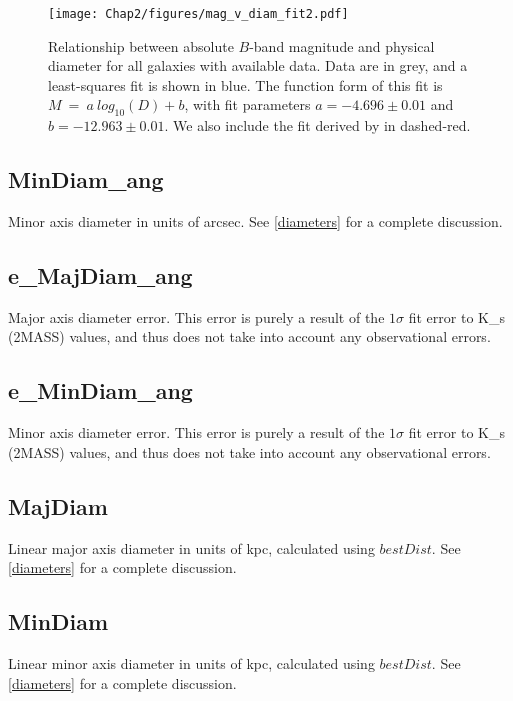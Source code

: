 \begin{figure}[ht!]
        \centering
        \vspace{0pt}
        \texttt{[image: Chap2/figures/mag\_v\_diam\_fit2.pdf]}
        \caption{\small{Relationship between absolute $B$-band magnitude and physical diameter for all galaxies with available data. Data are in grey, and a least-squares fit is shown in blue. The function form of this fit is $M ~=~ a ~ log_{10}(D) + b$, with fit parameters $a = -4.696 \pm 0.01$ and $b = -12.963 \pm 0.01$. We also include the fit derived by \cite{wakker2009} in dashed-red.}}
        \label{magvdiam}
\end{figure}


\subsection{MinDiam\_ang} \label{MinDiam_ang}
Minor axis diameter in units of arcsec. See \ref{diameters} for a complete discussion.

\subsection{e\_MajDiam\_ang} \label{e_MinDiam_ang}
Major axis diameter error. This error is purely a result of the $1\sigma$ fit error to K\_s (2MASS) values, and thus does not take into account any observational errors.

\subsection{e\_MinDiam\_ang} \label{e_MinDiam_ang}
Minor axis diameter error. This error is purely a result of the $1\sigma$ fit error to K\_s (2MASS) values, and thus does not take into account any observational errors.

\subsection{MajDiam} \label{MajDiam}
Linear major axis diameter in units of kpc, calculated using $bestDist$. See \ref{diameters} for a complete discussion.

\subsection{MinDiam} \label{MinDiam}
Linear minor axis diameter in units of kpc, calculated using $bestDist$. See \ref{diameters} for a complete discussion.

